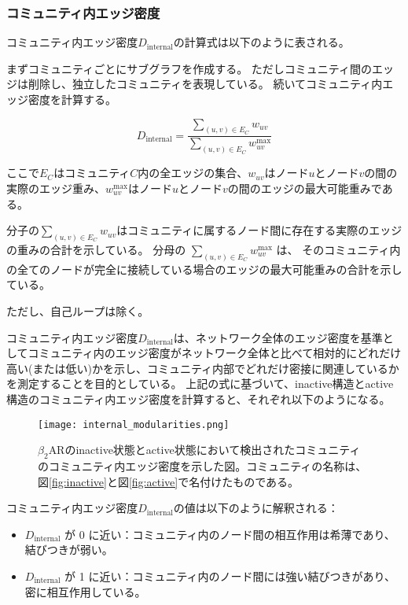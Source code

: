 \subsubsection{コミュニティ内エッジ密度}
コミュニティ内エッジ密度$D_{\text{internal}}$の計算式は以下のように表される。

まずコミュニティごとにサブグラフを作成する。
ただしコミュニティ間のエッジは削除し、独立したコミュニティを表現している。
続いてコミュニティ内エッジ密度を計算する。

\[
D_{\text{internal}} = \frac{\sum_{(u,v) \in E_C} w_{uv}}{\sum_{(u,v) \in E_C} w_{uv}^{\text{max}}}
\label{eq:internal_density}
\]

ここで$E_C$はコミュニティ$C$内の全エッジの集合、$w_{uv}$はノード$u$とノード$v$の間の実際のエッジ重み、$w_{uv}^{\text{max}}$はノード$u$とノード$v$の間のエッジの最大可能重みである。

分子の\(\sum_{(u,v) \in E_C} w_{uv}\)はコミュニティに属するノード間に存在する実際のエッジの重みの合計を示している。
分母の \(\sum_{(u,v) \in E_C} w_{uv}^{\text{max}}\) は、
そのコミュニティ内の全てのノードが完全に接続している場合のエッジの最大可能重みの合計を示している。

ただし、自己ループは除く。


コミュニティ内エッジ密度$D_{\text{internal}}$は、ネットワーク全体のエッジ密度を基準としてコミュニティ内のエッジ密度がネットワーク全体と比べて相対的にどれだけ高い(または低い)かを示し、コミュニティ内部でどれだけ密接に関連しているかを測定することを目的としている。
上記の式に基づいて、inactive構造とactive構造のコミュニティ内エッジ密度を計算すると、それぞれ以下のようになる。

\begin{figure}[htbp]
    \centering
    \texttt{[image: internal\_modularities.png]}
    \caption{$\beta_2$ARのinactive状態とactive状態において検出されたコミュニティのコミュニティ内エッジ密度を示した図。コミュニティの名称は、図\ref{fig:inactive}と図\ref{fig:active}で名付けたものである。}
    \label{fig:internal}
\end{figure}

\newpage

コミュニティ内エッジ密度$D_{\text{internal}}$の値は以下のように解釈される：
\begin{itemize}
    \item \( D_{\text{internal}} \) が 0 に近い：コミュニティ内のノード間の相互作用は希薄であり、結びつきが弱い。
    \item \( D_{\text{internal}} \) が 1 に近い：コミュニティ内のノード間には強い結びつきがあり、密に相互作用している。
\end{itemize}

